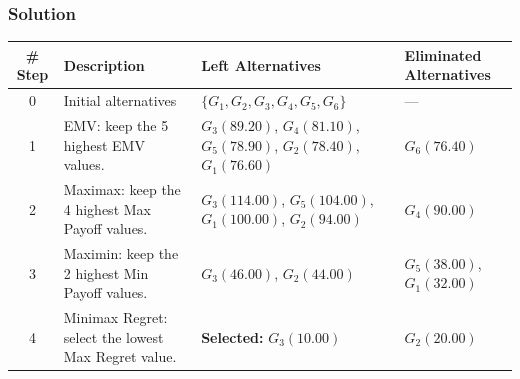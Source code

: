 
\subsubsection*{Solution}
\label{subsec:c9-finance-solution}
\begin{center}
\small
\begin{tabularx}{\textwidth}{@{}c >{\raggedright\arraybackslash}X >{\raggedright\arraybackslash}p{} >{\raggedright\arraybackslash}p{}@{}}
\toprule
\# Step & Description & Left Alternatives & Eliminated Alternatives \\
\midrule
0 & Initial alternatives & $\{G_1,G_2,G_3,G_4,G_5,G_6\}$ & --- \\
1 & EMV: keep the 5 highest EMV values. & $G_3(89.20)$, $G_4(81.10)$, $G_5(78.90)$, $G_2(78.40)$, $G_1(76.60)$ & $G_6(76.40)$ \\
2 & Maximax: keep the 4 highest Max Payoff values. & $G_3(114.00)$, $G_5(104.00)$, $G_1(100.00)$, $G_2(94.00)$ & $G_4(90.00)$ \\
3 & Maximin: keep the 2 highest Min Payoff values. & $G_3(46.00)$, $G_2(44.00)$ & $G_5(38.00)$, $G_1(32.00)$ \\
4 & Minimax Regret: select the lowest Max Regret value. & \textbf{Selected:} $G_3(10.00)$ & $G_2(20.00)$ \\
\bottomrule
\end{tabularx}
\end{center}

